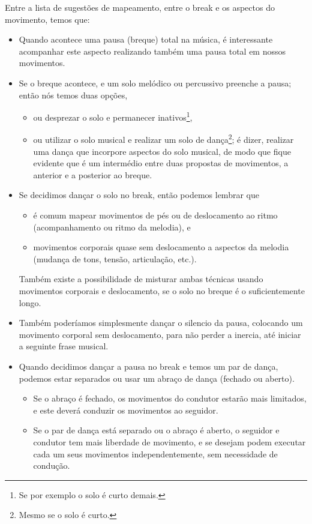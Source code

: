 Entre a lista de sugestões de mapeamento, 
entre o break e os aspectos do movimento, 
temos que:
\begin{itemize}
\item Quando acontece uma pausa (breque) total na música, 
é interessante acompanhar este aspecto realizando também uma pausa total em nossos movimentos.
\item Se o breque acontece,
e um solo melódico ou percussivo preenche a pausa;
então nós temos duas opções, 
\begin{itemize}
\item ou desprezar o solo e permanecer inativos\footnote{Se por exemplo o solo é curto demais.},
\item ou utilizar o solo musical e realizar um solo de dança\footnote{Mesmo se o solo é curto.};
é dizer, realizar uma dança que incorpore aspectos do solo musical,
de modo que fique evidente que é um intermédio entre duas propostas de movimentos,
a anterior e a posterior ao breque.
\end{itemize}
\item Se decidimos dançar o solo no break, 
então podemos lembrar que 
\begin{itemize}
\item é comum mapear movimentos de pés ou de deslocamento ao ritmo 
(acompanhamento ou ritmo da melodia), e 
\item movimentos corporais quase sem deslocamento a aspectos da melodia (mudança de tons, tensão, articulação, etc.).
\end{itemize}
Também existe a possibilidade de misturar ambas técnicas usando movimentos corporais e deslocamento,
se o solo no breque é o suficientemente longo.
\item Também poderíamos simplesmente dançar o silencio da pausa, colocando um movimento corporal sem deslocamento,
para não perder a inercia, até iniciar a seguinte frase musical.
\item Quando decidimos dançar a pausa no break e temos um par de dança,
podemos estar separados ou usar um abraço de dança (fechado ou aberto).
\begin{itemize}
\item Se o abraço é fechado, os movimentos do condutor estarão mais limitados,
e este deverá conduzir os movimentos ao seguidor.
\item Se o par de dança está separado ou o abraço é aberto, 
o seguidor e condutor tem mais liberdade de movimento,
e se desejam podem executar cada um seus movimentos independentemente,
sem necessidade de condução. 

\end{itemize}
\end{itemize}

